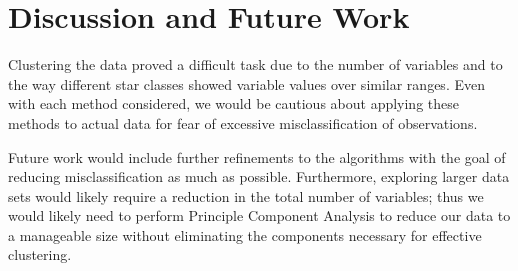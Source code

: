 \documentclass[12pt]{article}
\begin{document}
\section{Discussion and Future Work}
Clustering the data proved a difficult task due to the number of variables and to the way different star classes showed variable values over similar ranges.  Even with each method considered, we would be cautious about applying these methods to actual data for fear of excessive misclassification of observations.

Future work would include further refinements to the algorithms with the goal of reducing misclassification as much as possible.  Furthermore, exploring larger data sets would likely require a reduction in the total number of variables; thus we would likely need to perform Principle Component Analysis to reduce our data to a manageable size without eliminating the components necessary for effective clustering.  
\end{document}
